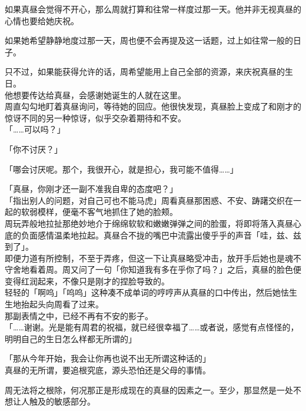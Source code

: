 如果真昼会觉得不开心，那么周就打算和往常一样度过那一天。他并非无视真昼的心情也要给她庆祝。

如果她希望静静地度过那一天，周也便不会再提及这一话题，过上如往常一般的日子。

只不过，如果能获得允许的话，周希望能用上自己全部的资源，来庆祝真昼的生日。\\

他想要传达给真昼，会感谢她诞生的人就在这里。\\

周直勾勾地盯着真昼询问，等待她的回应。他很快发现，真昼脸上变成了和刚才的惊讶不同的另一种惊讶，似乎交杂着期待和不安。\\

「……可以吗？」

「你不讨厌？」

「哪会讨厌呢。那个，我很开心，就是担心，我可能不值得……」

「真昼，你刚才还一副不准我自卑的态度吧？」\\

「指出别人的问题，对自己可也不能马虎」周看真昼那困惑、不安、踌躇交织在一起的软弱模样，便毫不客气地抓住了她的脸颊。\\

周玩弄般地拉扯那绝妙地介于绵绵软软和嫩嫩弹弹之间的脸蛋，将即将落入真昼心底的负面感情温柔地拉起。真昼合不拢的嘴巴中流露出傻乎乎的声音「哇，兹、兹到了」。\\

即便力道有所控制，不至于弄疼，但这一下让真昼略受冲击，放开手后她也是魂不守舍地看着周。周又问了一句「你知道我有多在乎你了吗？」之后，真昼的脸色便变得红润起来，不像只是刚才的捏脸导致的。\\

轻轻的「啊呜」「呜呜」这种凑不成单词的哼哼声从真昼的口中传出，然后她怯生生地抬起头向周看了过来。\\

那副表情之中，已经不再有不安的影子。\\

「……谢谢。光是能有周君的祝福，就已经很幸福了……或者说，感觉有点怪怪的，明明自己的生日怎么样都无所谓的」

「那从今年开始，我会让你再也说不出无所谓这种话的」\\

真昼的无所谓，要追根究底，源头恐怕还是父母的事情。

周无法将之根除，何况那正是形成现在的真昼的因素之一。至少，那显然是一处不想让人触及的敏感部分。\\

